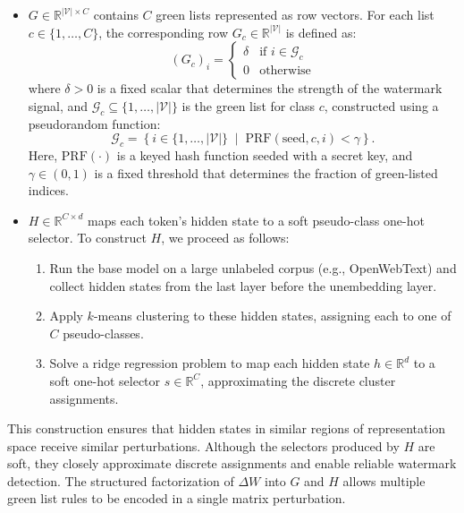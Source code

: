 \begin{itemize}
    \item \( G \in \mathbb{R}^{|\mathcal{V}| \times C} \) contains \( C \) green lists represented as row vectors. For each list \( c \in \{1, \dots, C\} \), the corresponding row \( G_c \in \mathbb{R}^{|\mathcal{V}|} \) is defined as:
          \[
              (G_c)_i =
              \begin{cases}
                  \delta & \text{if } i \in \mathcal{G}_c \\
                  0      & \text{otherwise}
              \end{cases}
          \]
          where \( \delta > 0 \) is a fixed scalar that determines the strength of the watermark signal, and \( \mathcal{G}_c \subseteq \{1, \dots, |\mathcal{V}|\} \) is the green list for class \( c \), constructed using a pseudorandom function:
          \[
              \mathcal{G}_c = \left\{ i \in \{1, \dots, |\mathcal{V}|\} \;\middle|\; \mathrm{PRF}(\text{seed}, c, i) < \gamma \right\}.
          \]
          Here, \(\mathrm{PRF}(\cdot)\) is a keyed hash function seeded with a secret key, and \(\gamma \in (0,1)\) is a fixed threshold that determines the fraction of green-listed indices.

    \item \( H \in \mathbb{R}^{C \times d} \) maps each token's hidden state to a soft pseudo-class one-hot selector. To construct \( H \), we proceed as follows:
          \begin{enumerate}
              \item Run the base model on a large unlabeled corpus (e.g., OpenWebText) and collect hidden states from the last layer before the unembedding layer.
              \item Apply \( k \)-means clustering to these hidden states, assigning each to one of \( C \) pseudo-classes.
              \item Solve a ridge regression problem to map each hidden state \( h \in \mathbb{R}^d \) to a soft one-hot selector \( s \in \mathbb{R}^C \), approximating the discrete cluster assignments.
          \end{enumerate}
\end{itemize}

This construction ensures that hidden states in similar regions of representation space receive similar perturbations. Although the selectors produced by \( H \) are soft, they closely approximate discrete assignments and enable reliable watermark detection. The structured factorization of \( \Delta W \) into \( G \) and \( H \) allows multiple green list rules to be encoded in a single matrix perturbation.

